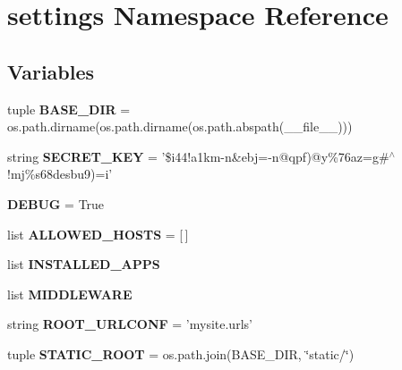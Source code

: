 \hypertarget{namespacesettings}{\section{settings Namespace Reference}
\label{namespacesettings}
}
\subsection*{Variables}
\begin{DoxyCompactItemize}
\item 
\hypertarget{namespacesettings_a5e244a7898f87f2a64fed98f7000f0f7}{tuple {\bfseries B\-A\-S\-E\-\_\-\-D\-I\-R} = os.\-path.\-dirname(os.\-path.\-dirname(os.\-path.\-abspath(\-\_\-\-\_\-file\-\_\-\-\_\-)))}\label{namespacesettings_a5e244a7898f87f2a64fed98f7000f0f7}

\item 
\hypertarget{namespacesettings_ae258c567b27a8db688302246e7a52f99}{string {\bfseries S\-E\-C\-R\-E\-T\-\_\-\-K\-E\-Y} = '\$i44!a1km-\/n\&ebj=-\/n@qpf)@y\%76az=g\#$^\wedge$!mj\%s68desbu9)=i'}\label{namespacesettings_ae258c567b27a8db688302246e7a52f99}

\item 
\hypertarget{namespacesettings_a287a1d61be7266e79849a83519001fe8}{{\bfseries D\-E\-B\-U\-G} = True}\label{namespacesettings_a287a1d61be7266e79849a83519001fe8}

\item 
\hypertarget{namespacesettings_a308fbcf4efd00621f112cf4e0d886fd5}{list {\bfseries A\-L\-L\-O\-W\-E\-D\-\_\-\-H\-O\-S\-T\-S} = \mbox{[}$\,$\mbox{]}}\label{namespacesettings_a308fbcf4efd00621f112cf4e0d886fd5}

\item 
list {\bfseries I\-N\-S\-T\-A\-L\-L\-E\-D\-\_\-\-A\-P\-P\-S}
\item 
list {\bfseries M\-I\-D\-D\-L\-E\-W\-A\-R\-E}
\item 
\hypertarget{namespacesettings_ac96554a715002f95512fb0548ccd2d51}{string {\bfseries R\-O\-O\-T\-\_\-\-U\-R\-L\-C\-O\-N\-F} = 'mysite.\-urls'}\label{namespacesettings_ac96554a715002f95512fb0548ccd2d51}

\item 
\hypertarget{namespacesettings_a612a7552f9a5fe961d2c4a4ffaf6cf29}{tuple {\bfseries S\-T\-A\-T\-I\-C\-\_\-\-R\-O\-O\-T} = os.\-path.\-join(B\-A\-S\-E\-\_\-\-D\-I\-R, \char`\"{}static/\char`\"{})}\label{namespacesettings_a612a7552f9a5fe961d2c4a4ffaf6cf29}


\end{DoxyCompactItemize}
